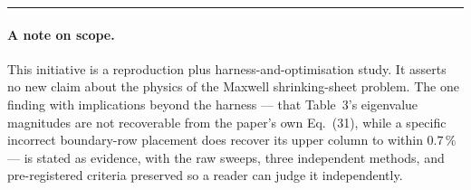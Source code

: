 \documentclass[11pt,a4paper]{article}
\newcommand{\pct}{\,\%}
\begin{document}
\vspace{1em}
\noindent\rule{\textwidth}{0.4pt}

\paragraph{A note on scope.} This initiative is a reproduction plus
harness-and-optimisation study. It asserts no new claim about the physics of the Maxwell
shrinking-sheet problem. The one finding with implications beyond the harness --- that
Table~3's eigenvalue magnitudes are not recoverable from the paper's own Eq.~(31), while a
specific incorrect boundary-row placement does recover its upper column to within
$0.7\pct$ --- is stated as evidence, with the raw sweeps, three independent methods, and
pre-registered criteria preserved so a reader can judge it independently.
\end{document}
